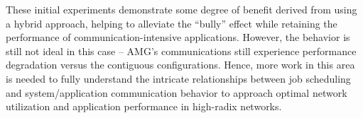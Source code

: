 These initial experiments demonstrate some degree of benefit derived from using a hybrid approach, helping to alleviate the ``bully'' effect while retaining the performance of communication-intensive applications. However, the behavior is still not ideal in this case -- AMG's communications still experience performance degradation versus the contiguous configurations. Hence, more work in this area is needed to fully understand the intricate relationships between job scheduling and system/application communication behavior to approach optimal network utilization and application performance in high-radix networks.
